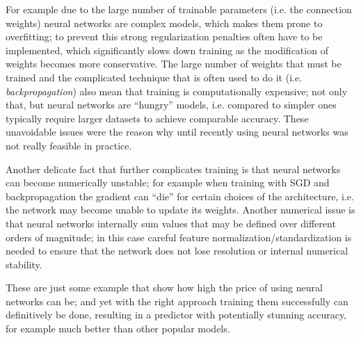 For example due to the large number of trainable parameters (i.e. the connection weights) neural networks are complex models, which makes them prone to overfitting; to prevent this strong regularization penalties often have to be implemented, which significantly slows down training as the modification of weights becomes more conservative.
The large number of weights that must be trained and the complicated technique that is often used to do it (i.e. \emph{backpropagation}) also mean that training is computationally expensive; not only that, but neural networks are ``hungry'' models, i.e. compared to simpler ones typically require larger datasets to achieve comparable accuracy. These unavoidable issues were the reason why until recently using neural networks was not really feasible in practice.

Another delicate fact that further complicates training is that neural networks can become numerically unstable; for example when training with SGD and backpropagation the gradient can ``die'' for certain choices of the architecture, i.e. the network may become unable to update its weights.
Another numerical issue is that neural networks internally sum values that may be defined over different orders of magnitude; in this case careful feature normalization/standardization is needed to ensure that the network does not lose resolution or internal numerical stability.

These are just some example that show how high the price of using neural networks can be; and yet with the right approach training them successfully can definitively be done, resulting in a predictor with potentially stunning accuracy, for example much better than other popular models.




